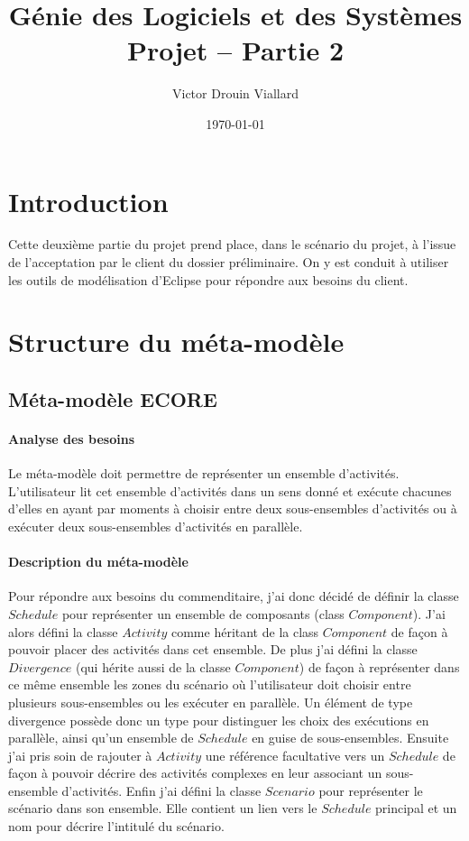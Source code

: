 \documentclass[12pt]{article}
\title{Génie des Logiciels et des Systèmes\\Projet -- Partie 2}
\author{Victor Drouin Viallard}
\date{\today}
\begin{document}
\maketitle
\newpage

\tableofcontents
\newpage

\section{Introduction}
Cette deuxième partie du projet prend place, dans le scénario du projet, à l'issue de l'acceptation par le client du dossier préliminaire. On y est conduit à utiliser les outils de modélisation d'Eclipse pour répondre aux besoins du client.

\section{Structure du méta-modèle}
\subsection{Méta-modèle ECORE}
\paragraph{Analyse des besoins}
Le méta-modèle doit permettre de représenter un ensemble d'activités. L'utilisateur lit cet ensemble d'activités dans un sens donné et exécute chacunes d'elles en ayant par moments à choisir entre deux sous-ensembles d'activités ou à exécuter deux sous-ensembles d'activités en parallèle.

\paragraph{Description du méta-modèle}
Pour répondre aux besoins du commenditaire, j'ai donc décidé de définir la classe $Schedule$ pour représenter un ensemble de composants (class $Component$). J'ai alors défini la classe $Activity$ comme héritant de la class $Component$ de façon à pouvoir placer des activités dans cet ensemble. De plus j'ai défini la classe $Divergence$ (qui hérite aussi de la classe $Component$) de façon à représenter dans ce même ensemble les zones du scénario où l'utilisateur doit choisir entre plusieurs sous-ensembles ou les exécuter en parallèle. Un élément de type divergence possède donc un type pour distinguer les choix des exécutions en parallèle, ainsi qu'un ensemble de $Schedule$ en guise de sous-ensembles.
Ensuite j'ai pris soin de rajouter à $Activity$ une référence facultative vers un $Schedule$ de façon à pouvoir décrire des activités complexes en leur associant un sous-ensemble d'activités.
Enfin j'ai défini la classe $Scenario$ pour représenter le scénario dans son ensemble. Elle contient un lien vers le $Schedule$ principal et un nom pour décrire l'intitulé du scénario.
\end{document}
